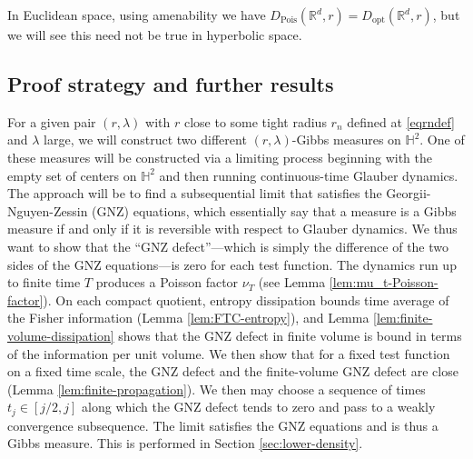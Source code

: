 \documentclass[11pt]{amsart}
\theoremstyle{definition}
\theoremstyle{remark}
\renewcommand{\H}{\mathbb{H}}
\newcommand{\R}{\mathbb{R}}
\newcommand{\opt}{\operatorname{opt}}
\newcommand{\Pois}{\operatorname{Pois}}
\newcommand{\Dopt}{D_{\opt}}
\newcommand{\lam}{\lambda}
\begin{document}
In Euclidean space, using amenability we have $D_{\Pois}(\R^d,r) = \Dopt(\R^d,r)$, but we will see this need not be true in hyperbolic space.








\subsection{Proof strategy and further results} 



For a given pair $(r, \lam)$ with $r$ close to some  tight radius $r_n$ defined at \eqref{eqrndef} and $\lam$ large, we will construct two different $(r,\lam)$-Gibbs measures on $\H^2$.
One of these measures will be constructed via a limiting process  beginning with the empty set of centers on $\H^2$ and then running continuous-time Glauber dynamics.  The approach will be to find a subsequential limit that satisfies the Georgii-Nguyen-Zessin (GNZ) equations, which essentially say that a measure is a Gibbs measure if and only if it is reversible with respect to Glauber dynamics.  We thus want to show that the ``GNZ defect''---which is simply the difference of the two sides of the GNZ equations---is zero for each test function.  The dynamics run up to finite time $T$ produces a Poisson factor $\nu_T$ (see Lemma \ref{lem:mu_t-Poisson-factor}). On each compact quotient, entropy dissipation bounds time average of the Fisher information (Lemma \ref{lem:FTC-entropy}), and Lemma \ref{lem:finite-volume-dissipation} shows that the GNZ defect in finite volume is bound in terms of the information per unit volume.   We then show that for a fixed test function on a fixed time scale, the GNZ defect and the finite-volume GNZ defect are close (Lemma \ref{lem:finite-propagation}).  We then may choose a sequence of times $t_j \in [j/2,j]$ along which the GNZ defect tends to zero and pass to a weakly convergence subsequence.  The limit satisfies the GNZ equations and is thus a Gibbs measure. This is performed in Section \ref{sec:lower-density}.  
\end{document}
